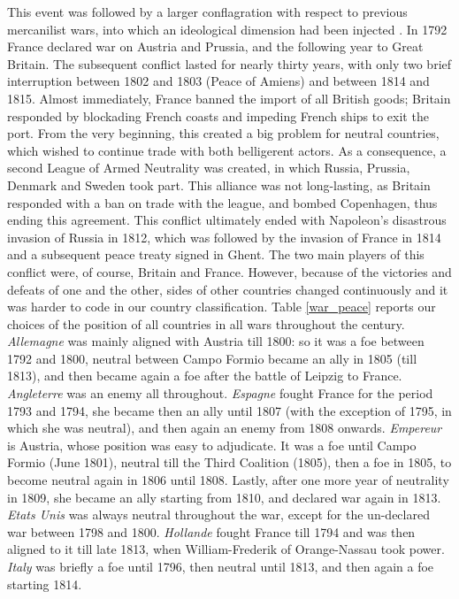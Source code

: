 \documentclass[12pt,a4paper,notitlepage,english]{article}
\begin{document}
This event was followed by a larger conflagration with respect to previous mercanilist wars, into which an ideological dimension had been injected \citep{ORourke2006}.
In 1792 France declared war on Austria and Prussia, and the following year to Great Britain.
The subsequent conflict lasted for nearly thirty years, with only two brief interruption between 1802 and 1803 (Peace of Amiens) and between 1814 and 1815.
Almost immediately, France banned the import of all British goods; Britain responded by blockading French coasts and impeding French ships to exit the port.
From the very beginning, this created a big problem for neutral countries, which wished to continue trade with both belligerent actors.
As a consequence, a second League of Armed Neutrality was created, in which Russia, Prussia, Denmark and Sweden took part.
This alliance was not long-lasting, as Britain responded with a ban on trade with the league, and bombed Copenhagen, thus ending this agreement.
This conflict ultimately ended with Napoleon's disastrous invasion of Russia in 1812, which was followed by the invasion of France in 1814 and a subsequent peace treaty signed in Ghent.
The two main players of this conflict were, of course, Britain and France.
However, because of the victories and defeats of one and the other, sides of other countries changed continuously and it was harder to code in our country classification. Table \ref{war_peace} reports our choices of the position of all countries in all wars throughout the century. 
\textit{Allemagne} was mainly aligned with Austria till 1800: so it was a foe between 1792 and 1800, neutral between Campo Formio became an ally in 1805 (till 1813), and then became again a foe after the battle of Leipzig to France.
\textit{Angleterre} was an enemy all throughout.
\textit{Espagne} fought France for the period 1793 and 1794, she became then an ally until 1807 (with the exception of 1795, in which she was neutral), and then again an enemy from 1808 onwards.
\textit{Empereur} is Austria, whose position was easy to adjudicate. It was a foe until Campo Formio (June 1801), neutral till the Third Coalition (1805), then a foe in 1805, to become neutral again in 1806 until 1808.
Lastly, after one more year of neutrality in 1809, she became an ally starting from 1810, and declared war again in 1813.
\textit{Etats Unis} was always neutral throughout the war, except for the un-declared war between 1798 and 1800.
\textit{Hollande} fought France till 1794 and was then aligned to it till late 1813, when William-Frederik of Orange-Nassau took power.
\textit{Italy} was briefly a foe until 1796, then neutral until 1813, and then again a foe starting 1814.
\end{document}

